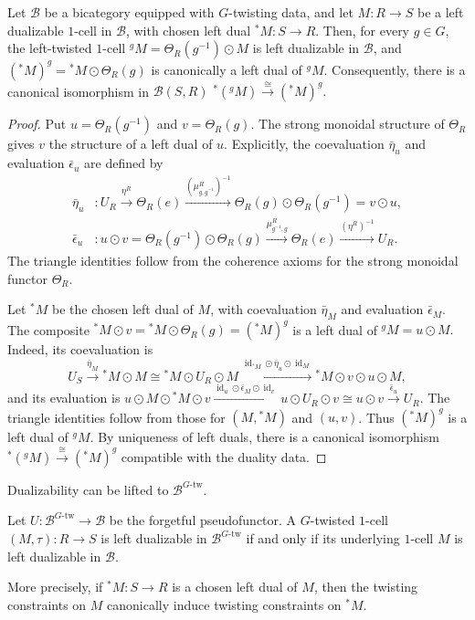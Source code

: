 \documentclass[11pt,oneside]{amsart}
\DeclareMathOperator{\id}{id}
\numberwithin{equation}{section}
\numberwithin{figure}{section}
\theoremstyle{plain}
\theoremstyle{definition}
\theoremstyle{remark}
\begin{document}
\begin{lemma}\label{lem:dual-of-twist}
Let \(\mathcal B\) be a bicategory equipped with \(G\)-twisting data, and let \(M:R\to S\) be a left dualizable \(1\)-cell in \(\mathcal B\), with chosen left dual \({}^*M:S\to R\). Then, for every \(g\in G\), the left-twisted \(1\)-cell 
\(
{}^gM=\Theta_R(g^{-1})\odot M
\)
is left dualizable in \(\mathcal B\), and 
\(
({}^*M)^g = {}^*M\odot\Theta_R(g)
\)
is canonically a left dual of \({}^gM\). Consequently, there is a canonical isomorphism in \(\mathcal B(S,R)\)
\(
{}^*({}^gM)\xrightarrow{\cong}({}^*M)^g.
\)
\end{lemma}
\begin{proof}
Put
\(u=\Theta_R(g^{-1})
\) and \(v=\Theta_R(g).\)
The strong monoidal structure of \(\Theta_R\) gives \(v\) the structure
of a left dual of \(u\). 
Explicitly, the coevaluation $\bar{\eta}_u$ and evaluation $\bar{\epsilon}_u$ are defined by
\begin{align*}
\bar{\eta}_u&\colon
U_R
\xrightarrow{\eta^R}
\Theta_R(e)
\xrightarrow{(\mu^R_{g,g^{-1}})^{-1}}
\Theta_R(g)\odot\Theta_R(g^{-1})
=
v\odot u, \\
\bar{\epsilon}_u&\colon
u\odot v
=
\Theta_R(g^{-1})\odot\Theta_R(g)
\xrightarrow{\mu^R_{g^{-1},g}}
\Theta_R(e)
\xrightarrow{(\eta^R)^{-1}}
U_R.\end{align*}
The triangle identities follow from the coherence axioms for the
strong monoidal functor \(\Theta_R\).

Let \({}^*M\) be the chosen left dual of \(M\), with coevaluation
\(\bar{\eta}_M\) and evaluation \(\bar{\epsilon}_M\). The composite
\(
{}^*M\odot v
=
{}^*M\odot\Theta_R(g)
=
({}^*M)^g
\)
is a left dual of
\(
{}^gM=u\odot M.
\)
Indeed, its coevaluation is
\[
U_S
\xrightarrow{\bar{\eta}_M}
{}^*M\odot M
\cong
{}^*M\odot U_R\odot M
\xrightarrow{
  \id_{{}^*M}\odot\bar{\eta}_u\odot\id_M
}
{}^*M\odot v\odot u\odot M,
\]
and its evaluation is
\(
u\odot M\odot{}^*M\odot v
\xrightarrow{
  \id_u\odot\bar{\epsilon}_M\odot\id_v
}
u\odot U_R\odot v
\cong
u\odot v
\xrightarrow{\bar{\epsilon}_u}
U_R.
\)
The triangle identities follow from those for
\((M,{}^*M)\) and \((u,v)\). Thus \(({}^*M)^g\) is a left dual of
\({}^gM\). By uniqueness of left duals, there is a canonical
isomorphism
\(
{}^*({}^gM)\xrightarrow{\cong}({}^*M)^g
\)
compatible with the duality data.
\end{proof}
 

Dualizability can be lifted to \(\mathcal B^{G\text{-tw}}\).

\begin{prop}\label{prop:Gtw-dualizable-recognition}
Let
\(
U:\mathcal B^{G\text{-tw}}\to\mathcal B
\)
be the forgetful pseudofunctor.
A \(G\)-twisted \(1\)-cell
\((M,\tau):R\to S\)
is left dualizable in
\(\mathcal B^{G\text{-tw}}\)
if and only if its underlying \(1\)-cell \(M\) is left dualizable
in \(\mathcal B\).

More precisely, if \({}^*M:S\to R\) is a chosen left dual of \(M\),
then the twisting constraints on \(M\) canonically induce twisting
constraints on \({}^*M\).
\end{prop}
\end{document}
